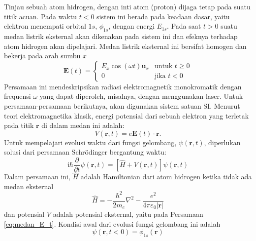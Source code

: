 \documentclass[a4paper,bahasa]{paper}
\renewcommand{\imath}{\mathfrak{i}}
\begin{document}
Tinjau sebuah atom hidrogen, dengan inti atom (proton) dijaga tetap pada suatu titik
acuan. Pada waktu $t < 0$ sistem ini berada pada keadaan dasar, yaitu elektron
menempati orbital $1s$, $\phi_{1s}$, dengan energi $E_{1s}$. Pada saat $t > 0$
suatu medan listrik eksternal akan dikenakan pada sistem ini dan efeknya
terhadap atom hidrogen akan dipelajari.
Medan listrik eksternal ini bersifat homogen dan bekerja pada arah sumbu $x$
%
\begin{equation}
\mathbf{E}(t) =
\begin{cases} 
E_{x} \cos(\omega t) \mathbf{u}_{x} & \mbox{untuk } t \geq 0\\
0 & \mbox{jika } t < 0
\end{cases}
\label{eq:medan_E_t}
\end{equation}
%
Persamaan ini mendeskripsikan radiasi elektromagnetik monokromatik
dengan frequensi $\omega$ yang dapat diperoleh, misalnya, dengan menggunakan
laser. Untuk persamaan-persamaan berikutnya, akan digunakan sistem satuan SI.
Menurut teori elektromagnetika klasik, energi potensial dari sebuah elektron
yang terletak pada titik $\mathbf{r}$ di dalam medan ini adalah:
\begin{equation}
V(\mathbf{r},t) = e \mathbf{E}(t) \cdot \mathbf{r}.
\end{equation}
Untuk mempelajari evolusi waktu dari fungsi gelombang, $\psi(\mathbf{r},t)$,
diperlukan solusi dari persamaan Schr\"{o}dinger bergantung waktu:
%
\begin{equation}
\imath \hbar \frac{\partial}{\partial t} \psi(\mathbf{r},t) =
\left[ \hat{H} + V(\mathbf{r},t) \right] \psi(\mathbf{r},t)
\label{eq:td_sch}
\end{equation}
%
Dalam persamaan ini, $\hat{H}$ adalah Hamiltonian dari atom hidrogen
ketika tidak ada medan eksternal
%
\begin{equation}
\hat{H} = -\frac{\hbar^2}{2m_{e}}\nabla^2 -
\frac{e^2}{4\pi\varepsilon_{0}\left|\mathbf{r}\right|}
\end{equation}
%
dan potensial $V$ adalah potensial eksternal, yaitu pada Persamaan \eqref{eq:medan_E_t}.
Kondisi awal dari evolusi fungsi gelombang ini adalah
\begin{equation}
\psi(\mathbf{r}, t < 0) = \phi_{1s}(\mathbf{r})
\end{equation}
\end{document}
